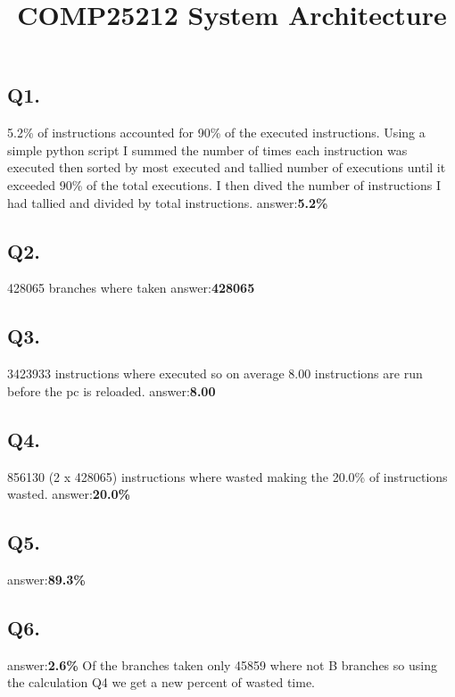 \documentclass[a4]{article}
\title{COMP25212 System Architecture}
\author{}
\begin{document}
\maketitle

\subsection*{Q1.}
5.2\% of instructions accounted for 90\% of the executed instructions. Using a simple python script I summed the number of times each instruction was executed then sorted by most executed
and tallied number of executions until it exceeded 90\% of the total executions. I then dived the number of instructions I had tallied and divided by total instructions.\newline
answer:\textbf{5.2\%}

\subsection*{Q2.}
428065 branches where taken\newline
answer:\textbf{428065}

\subsection*{Q3.}
3423933 instructions where executed so on average 8.00 instructions are run before the pc is reloaded.\newline
answer:\textbf{8.00}

\subsection*{Q4.}
856130 (2 x 428065) instructions where wasted making the 20.0\% of instructions wasted.\newline
answer:\textbf{20.0\%}

\subsection*{Q5.}
answer:\textbf{89.3\%}

\subsection*{Q6.}
answer:\textbf{2.6\%}\newline
Of the branches taken only 45859 where not B branches so using the calculation Q4 we get a new percent of wasted time.\newline
\end{document}

